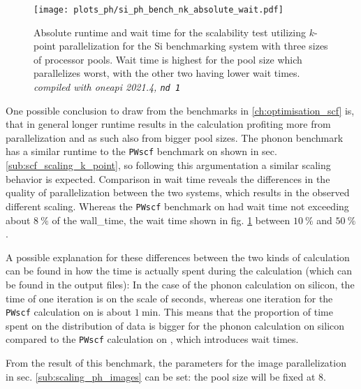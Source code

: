 \documentclass[main.tex]{subfiles}
\begin{document}
\begin{figure}[htb!]
    \centering
    \texttt{[image: plots\_ph/si\_ph\_bench\_nk\_absolute\_wait.pdf]}
    \caption{Absolute runtime and wait time for the scalability test utilizing \(k\)-point parallelization for the Si benchmarking system with three sizes of processor pools. Wait time is highest for the pool size which parallelizes worst, with the other two having lower wait times. \emph{\QE compiled with \gls{oneapi} 2021.4, \texttt{nd 1}}}
    \label{fig:scaling_ph_nk_si_absolute_wait}
\end{figure}
One possible conclusion to draw from the benchmarks in \cref{ch:optimisation_scf} is, that in general longer runtime results in the calculation profiting more from parallelization and as such also from bigger pool sizes.
The phonon benchmark has a similar runtime to the \texttt{PWscf} benchmark on \TaS shown in sec. \ref{sub:scf_scaling_k_point}, so following this argumentation a similar scaling behavior is expected.
Comparison in wait time reveals the differences in the quality of parallelization between the two systems, which results in the observed different scaling. 
Whereas the \texttt{PWscf} benchmark on \TaS had wait time not exceeding about \(\SI{8}{\percent}\) of the \gls{wall_time}, the wait time shown in fig. \ref{fig:scaling_ph_nk_si_absolute_wait} between \(\SI{10}{\percent}\) and \(\SI{50}{\percent}\).

A possible explanation for these differences between the two kinds of calculation can be found in how the time is actually spent during the calculation (which can be found in the \QE output files):
In the case of the phonon calculation on silicon, the time of one iteration is on the scale of seconds, whereas one iteration for the \texttt{PWscf} calculation on \TaS is about \(\SI{1}{\minute}\).
This means that the proportion of time spent on the distribution of data is bigger for the phonon calculation on silicon compared to the \texttt{PWscf} calculation on \TaS, which introduces wait times.

From the result of this benchmark, the parameters for the image parallelization in sec. \ref{sub:scaling_ph_images} can be set: the pool size will be fixed at 8.
\end{document}
